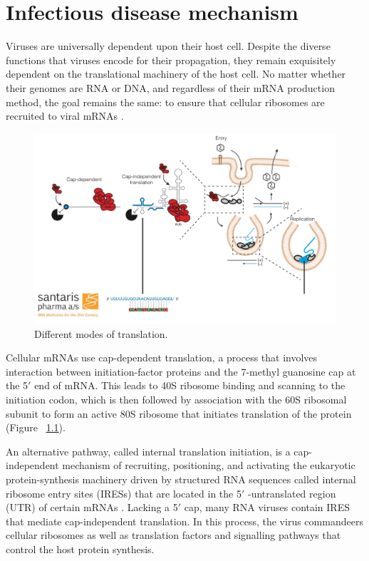 \chapter{Infectious disease mechanism}

Viruses are universally dependent upon their host cell. Despite the diverse functions that viruses encode for their propagation, they remain exquisitely dependent on the translational machinery of the host cell. No matter whether their genomes are RNA or DNA, and regardless of their mRNA production method, the goal remains the same: to ensure that cellular ribosomes are recruited to viral mRNAs \cite{Walsh:2011kt}.

\begin{figure}
\center\includegraphics[width=140mm,scale=0.5]{Figures/Fig19}
\caption{Different modes of translation.}
\label{fig:Fig19}
\end{figure}

Cellular mRNAs use cap-dependent translation, a process that involves interaction between initiation-factor proteins and the 7-methyl guanosine cap at the 5$'$ end of mRNA. This leads to 40S ribosome binding and scanning to the initiation codon, which is then followed by association with the 60S ribosomal subunit to form an active 80S ribosome that initiates translation of the protein (Figure ~\ref{fig:Fig19}).

An alternative pathway, called internal translation initiation, is a cap-independent mechanism of recruiting, positioning, and activating the eukaryotic protein-synthesis machinery driven by structured RNA sequences called internal ribosome entry sites (IRESs) that are located in the 5$'$ -untranslated region (UTR) of certain mRNAs \cite{Fraser:2006kn}. Lacking a 5$'$ cap, many RNA viruses contain IRES that mediate cap-independent translation. In this process, the virus commandeers cellular ribosomes as well as translation factors and signalling pathways that control the host protein synthesis. 

